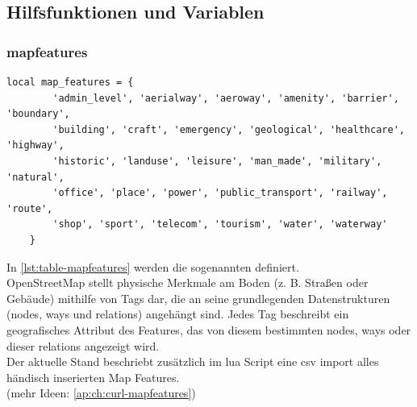 \subsection{Hilfsfunktionen und Variablen}
\subsubsection{mapfeatures}
\begin{lstlisting}[language={[5.0]Lua}, caption={Deklaration einer lua Tabelle für die mapfeatures},label={lst:table-mapfeatures}]
	local map_features = {
		'admin_level', 'aerialway', 'aeroway', 'amenity', 'barrier', 'boundary',
		'building', 'craft', 'emergency', 'geological', 'healthcare', 'highway',
		'historic', 'landuse', 'leisure', 'man_made', 'military', 'natural',
		'office', 'place', 'power', 'public_transport', 'railway', 'route',
		'shop', 'sport', 'telecom', 'tourism', 'water', 'waterway'
	}
\end{lstlisting}
In \autoref{lst:table-mapfeatures} werden die sogenannten \cite{osm-mapfeatures} definiert. \\
OpenStreetMap stellt physische Merkmale am Boden (z. B. Straßen oder Gebäude) mithilfe von Tags dar, die an seine grundlegenden Datenstrukturen (nodes, ways und relations) angehängt sind. Jedes Tag beschreibt ein geografisches Attribut des Features, das von diesem bestimmten nodes, ways oder dieser relations angezeigt wird.\\

Der aktuelle Stand beschriebt zusätzlich im lua Script eine csv import alles händisch inserierten Map Features. \\(mehr Ideen: \autoref{ap:ch:curl-mapfeatures})


